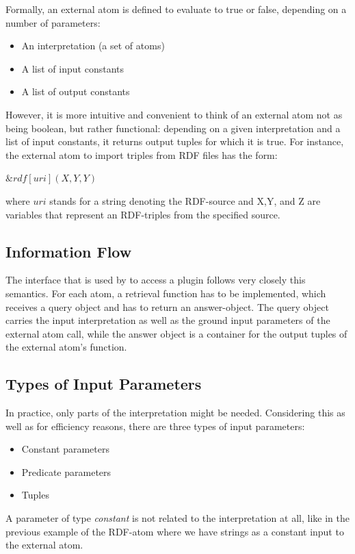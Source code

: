 \documentclass[a4paper, titlepage]{article}
\newcommand{\ext}[3]{\ensuremath{\&{#1}[#2](#3)}}
\begin{document}
Formally, an external atom is defined to evaluate to true
or false, depending on a number of parameters:
\begin{itemize}
\item An interpretation (a set of atoms)
\item A list of input constants
\item A list of output constants
\end{itemize}  
However, it is more intuitive and convenient to think of an 
external atom not as being boolean, but rather functional:
depending on a given interpretation and a list of input 
constants, it returns output tuples for which it is true. For instance, the 
external atom to import triples from RDF files has the 
form: \\
\centerline{$\ext{rdf}{uri}{X,Y,Y}$} 
where $\mathit{uri}$ stands for a string denoting the RDF-source and X,Y, and Z are variables that represent an RDF-triples from the specified source.

\subsection{Information Flow}
The interface that is used by \dlvhex{} to access a plugin 
follows very closely this semantics. For each atom, a 
retrieval function has to be implemented, which receives a 
query object and has to return an answer-object. The 
query object carries the input interpretation as well as 
the ground input parameters of the external atom call, 
while the answer object is a container for the output 
tuples of the external atom's function.   

\subsection{Types of Input Parameters}
In practice, only 
parts of the interpretation might be needed. Considering 
this as well as for efficiency reasons, there are three types of input parameters: 
\begin{itemize}
\item Constant parameters
\item Predicate parameters
\item Tuples
\end{itemize}

A parameter of type \emph{constant} is not related to the 
interpretation at all, like in the previous example of the 
RDF-atom where we have strings as a constant input to the external atom. 
\end{document}

